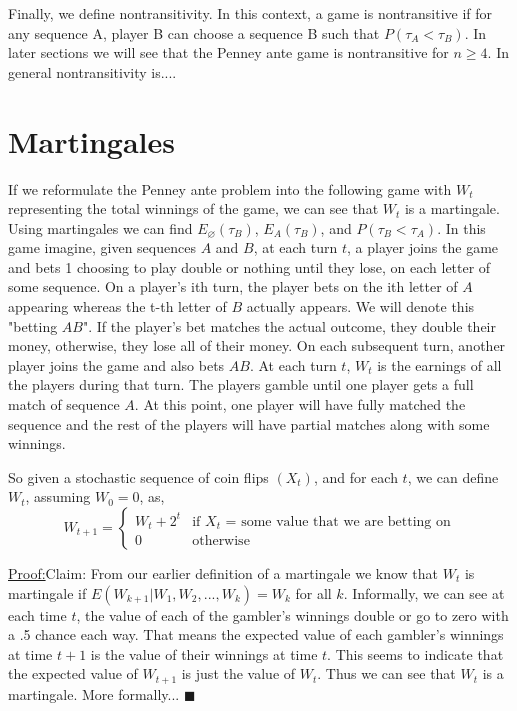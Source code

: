\documentclass{article}
\newenvironment{claim}[1]{\par\noindent\underline{Claim:}\space#1}{}
\newenvironment{claimproof}[1]{\par\noindent\underline{Proof:}\space#1}{\hfill $\blacksquare$}
\numberwithin{mytheorem}{subsection} %
\begin{document}
		Finally, we define nontransitivity. In this context, a game is nontransitive if for any sequence A, player B can choose a sequence B such that $P(\tau_A < \tau_B)$. In later sections we will see that the Penney ante game is nontransitive for $n \geq 4$. In general nontransitivity is....

	\section{Martingales}
	    If we reformulate the Penney ante problem into the following game with $W_t$ representing the total winnings of the game, we can see that $W_t$ is a martingale. Using martingales we can find $E_{\varnothing}(\tau_{B})$, $E_A(\tau_{B})$, and $P(\tau_{B} < \tau_{A})$. In this game imagine, given sequences $A$ and $B$, at each turn $t$, a player joins the game and bets 1 choosing to play double or nothing until they lose, on each letter of some sequence. On a player's ith turn, the player bets on the ith letter of $A$ appearing whereas the t-th letter of $B$ actually appears. We will denote this "betting $AB$". If the player's bet matches the actual outcome, they double their money, otherwise, they lose all of their money. On each subsequent turn, another player joins the game and also bets $AB$. At each turn $t$, $W_t$ is the earnings of all the players during that turn. The players gamble until one player gets a full match of sequence $A$. At this point, one player will have fully matched the sequence and the rest of the players will have partial matches along with some winnings.  

		So given a stochastic sequence of coin flips $(X_t)$, and for each $t$, we can define $W_t$, assuming $W_0=0$, as, 
	    \[ W_{t+1}=\begin{cases} 
	      W_{t} + 2^t & \text{if $X_t$ = some value that we are betting on}\\
	      0 & \text{otherwise} 
		  \end{cases} \]


		\begin{claimproof}
			Claim:  From our earlier definition of a martingale we know that $W_t$ is martingale if $E(W_{k+1} | W_1,W_2,...,W_k) = W_k$ for all $k$. Informally, we can see at each time $t$, the value of each of the gambler's winnings double or go to zero with a .5 chance each way. That means the expected value of each gambler's winnings at time $t+1$ is the value of their winnings at time $t$. This seems to indicate that the expected value of $W_{t+1}$ is just the value of $W_t$. Thus we can see that $W_t$ is a martingale. More formally... 
		\end{claimproof}
\end{document}
